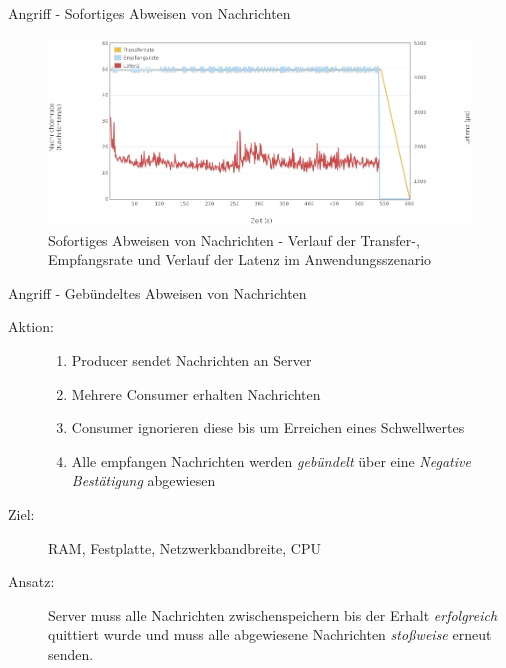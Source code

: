 \documentclass[10pt]{beamer}
\begin{document}
\begin{frame}{Angriff - Sofortiges Abweisen von Nachrichten}		
\begin{figure}[!htb]
	\centering
	\includegraphics[width=\textwidth]{img/reject/reject_scenario.png}
	\caption{\centering Sofortiges Abweisen von Nachrichten - Verlauf der Transfer-, Empfangsrate und Verlauf der Latenz im Anwendungsszenario}
	\label{fig:reject-scenario}
\end{figure}
\end{frame}

\begin{frame}[t]{Angriff - Gebündeltes Abweisen von Nachrichten}
\begin{description}
	\item[Aktion:]
		\begin{enumerate}
			\item Producer sendet Nachrichten an Server
			\item Mehrere Consumer erhalten Nachrichten
			\item Consumer ignorieren diese bis um Erreichen eines Schwellwertes
			\item Alle empfangen Nachrichten werden \textsl{gebündelt} über eine \textsl{Negative Bestätigung} abgewiesen 
		\end{enumerate}  \smallskip
	\item[Ziel:] RAM, Festplatte, Netzwerkbandbreite, CPU \smallskip
	\item[Ansatz:] Server muss alle Nachrichten zwischenspeichern bis der Erhalt \textsl{erfolgreich} quittiert wurde und muss alle abgewiesene Nachrichten \textsl{stoßweise} erneut senden.
\end{description}
\end{frame}
\end{document}
